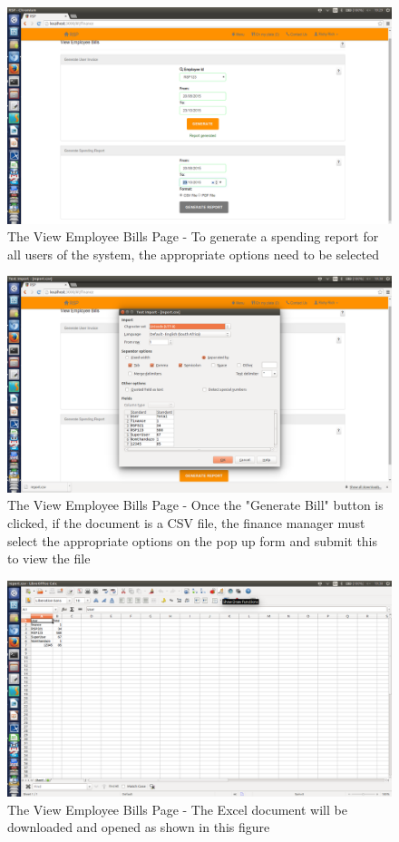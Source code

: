 \documentclass[a4paper,12pt]{report}
\begin{document}
\begin{figure}[H]
  \centering
    \includegraphics[width=1.0\textwidth]{screenshots/bill4.png}
    \caption{The View Employee Bills Page - To generate a spending report for all users of the system, the appropriate options need to be selected}
\end{figure}

\begin{figure}[H]
  \centering
    \includegraphics[width=1.0\textwidth]{screenshots/bill5.png}
    \caption{The View Employee Bills Page - Once the "Generate Bill" button is clicked, if the document is a CSV file, the finance manager must select the appropriate options on the pop up form and submit this to view the file}
\end{figure}

\begin{figure}[H]
  \centering
    \includegraphics[width=1.0\textwidth]{screenshots/bill6.png}
    \caption{The View Employee Bills Page - The Excel document will be downloaded and opened as shown in this figure}
\end{figure}
\end{document}
